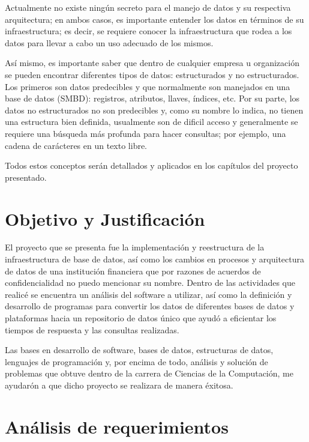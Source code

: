 \documentclass[a4paper,openright,12pt]{book}
\begin{document}
Actualmente no existe ningún secreto para el manejo de datos y su respectiva
arquitectura; en ambos casos, es importante entender los datos en términos de su
infraestructura; es decir, se requiere conocer la infraestructura que rodea a
los datos para llevar a cabo un uso adecuado de los mismos.

Así mismo, es importante saber que dentro de cualquier empresa u organización se
pueden encontrar diferentes tipos de datos: estructurados y no
estructurados. Los primeros son datos predecibles y que normalmente son
manejados en una base de datos (SMBD): registros, atributos, llaves, índices,
etc. Por su parte, los datos no estructurados no son predecibles y, como su
nombre lo indica, no tienen una estructura bien definida, usualmente son de
dificil acceso y generalmente se requiere una búsqueda más profunda para hacer
consultas; por ejemplo, una cadena de carácteres en un texto libre.

Todos estos conceptos serán detallados y aplicados en los capítulos del proyecto
presentado.

\chapter*{Objetivo y Justificación}
\label{cap.objetivo}

El proyecto que se presenta fue la implementación y reestructura de la
infraestructura de base de datos, así como los cambios en procesos y
arquitectura de datos de una institución financiera que por razones de acuerdos
de confidencialidad no puedo mencionar su nombre. Dentro de las actividades que
realicé se encuentra un análisis del software a utilizar, así como la definición
y desarrollo de programas para convertir los datos de diferentes bases de datos
y plataformas hacia un repositorio de datos único que ayudó a eficientar los
tiempos de respuesta y las consultas realizadas.

Las bases en desarrollo de software, bases de datos, estructuras de datos,
lenguajes de programación y, por encima de todo, análisis y solución de
problemas que obtuve dentro de la carrera de Ciencias de la Computación, me
ayudarón a que dicho proyecto se realizara de manera éxitosa.

\chapter{Análisis de requerimientos}
\label{cap.analisis}
\end{document}
